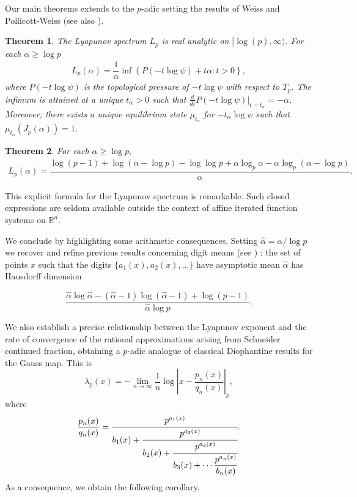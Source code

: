 \documentclass[11pt]{amsart}
\newtheorem{theorem}{Theorem}[section]
\theoremstyle{remark}
\numberwithin{equation}{section}
\begin{document}
Our main theorems extends to the $p$-adic setting the results of Weiss \cite{we} and Pollicott-Weiss \cite{mh} (see also \cite{io,kms,an}).

\begin{theorem}\label{PrincipalSinCalculoExplicito}
      The Lyapunov spectrum $L_{p}$ is real analytic on $[\log(p),\infty)$. For each $\alpha\geq  \log p$
    \begin{align}\label{EcuSInCalculoExplicito}
        L_{p}(\alpha)=\dfrac{1}{\alpha}\inf\left\{P(-t\log \psi)+t\alpha:t>0\right\},
    \end{align}where $P(-t\log\psi)$ is the topological pressure of $-t\log\psi$ with respect to $T_p$. The infimum is attained at a unique $t_{\alpha}>0$ such that $\frac{d}{dt}P(-t\log \psi)|_{t=t_{\alpha}}=-\alpha$. Moreover, there exists a unique equilibrium state $\mu_{t_{\alpha}}$ for $-t_{\alpha}\log \psi$ such that $\mu_{t_{\alpha}}(J_{p}(\alpha))=1$.
\end{theorem}

\begin{theorem}\label{PrincipalTheorem}
 For each $\alpha\geq \log p,$ 
    \begin{align}\label{Ecu2PrincipalTheorem}
        L_p(\alpha)=\dfrac{\log(p-1)+\log(\alpha-\log p)-\log\log p+\alpha\log_{p} \alpha-\alpha\log_{p}(\alpha-\log p)}{\alpha}.
    \end{align}
\end{theorem}

This explicit formula for the Lyapunov spectrum is remarkable. Such closed expressions are seldom available outside the context of affine iterated function systems on $\mathbb{R}^n$.

We conclude by highlighting some arithmetic consequences. 
Setting $\hat{\alpha}=\alpha/\log p$ we recover and refine previous results concerning digit means (see \cite[Theorem 2.2]{hyz}) : the set of points $x$ such that the digits $\{a_{1}(x),a_{2}(x),...\}$ have asymptotic mean $\hat{\alpha}$ has Hausdorff dimension 

   $$\dfrac{\widehat{\alpha}\log\widehat{\alpha}-(\widehat{\alpha}-1)\log(\widehat{\alpha}-1)+\log(p-1)}{\widehat{\alpha} \log p}.$$

We also establish a precise relationship between the Lyapunov exponent and the rate of convergence of the rational approximations arising from Schneider continued fraction, obtaining a $p$-adic analogue of classical Diophantine results for the Gauss map. This is
$$\lambda_p(x)=-\lim_{n\to \infty}\dfrac{1}{n}\log \left|x-\dfrac{p_n(x)}{q_n(x)}\right|_p,$$
where 
\begin{align*}
    \dfrac{p_{n}(x)}{q_{n}(x)}= \cfrac{p^{a_{1}(x)}}{b_{1}(x)+\cfrac{p^{a_{2}(x)}}{b_{2}(x)+\cfrac{p^{a_{3}(x)}}{b_{3}(x)+\cdots \dfrac{p^{a_{n}(x)}}{b_{n}(x)}}}}.
\end{align*}As a consequence, we obtain the following corollary.
\end{document}
